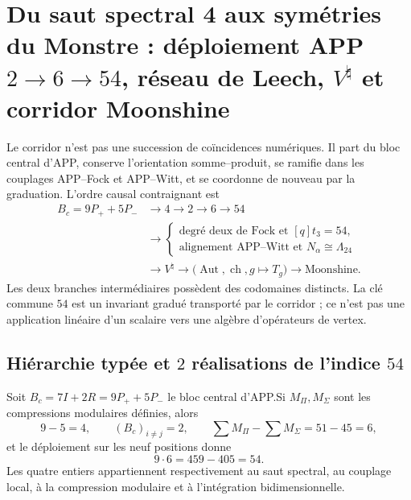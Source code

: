 \section{Du saut spectral 4 aux symétries du Monstre : déploiement APP
\texorpdfstring{$2\to6\to54$}{2--6--54}, réseau de Leech,
\texorpdfstring{$V^\natural$}{V natural} et corridor Moonshine}
\label{sec:cierre-equivalencias-corredor-moonshine-20260825}

Le corridor n'est pas une succession de coïncidences numériques. Il part du bloc
central d'APP, conserve l'orientation somme--produit, se ramifie dans les
couplages APP--Fock et APP--Witt, et se coordonne de nouveau par la
graduation. L'ordre causal contraignant est
\[\begin{aligned}
 B_c=9P_++5P_-
 &\longrightarrow 4\longrightarrow2\longrightarrow6\longrightarrow54\\
 &\longrightarrow
 \left\{
 \begin{array}{l}
  \text{degré deux de Fock et }[q]t_3=54,\\
  \text{alignement APP--Witt et }N_\alpha\cong\Lambda_{24}
 \end{array}
 \right.\\
 &\longrightarrow V^\natural
 \longrightarrow
 \bigl(\operatorname{Aut},\operatorname{ch},g\mapsto T_g\bigr)
 \longrightarrow\text{Moonshine}.
\end{aligned}\]
Les deux branches intermédiaires possèdent des codomaines distincts. La clé commune \(54\)
est un invariant gradué transporté par le corridor ; ce n'est pas une application
linéaire d'un scalaire vers une algèbre d'opérateurs de vertex.

\subsection{Hiérarchie typée et \(2\) réalisations de l'indice \(54\)}

\begin{theorem}
\label{thm:cierre-vtm-jerarquia-app}
Soit \(B_c=7I+2R=9P_++5P_-\) le bloc central d'APP.\@ Si
\(M_\Pi,M_\Sigma\) sont les compressions modulaires définies, alors
\[
 9-5=4,
 \qquad (B_c)_{i\ne j}=2,
 \qquad \sum M_\Pi-\sum M_\Sigma=51-45=6,
\]
et le déploiement sur les neuf positions donne
\[
 9\cdot6=459-405=54.
\]
Les quatre entiers appartiennent respectivement au saut spectral, au
couplage local, à la compression modulaire et à l'intégration bidimensionnelle.
\end{theorem}

